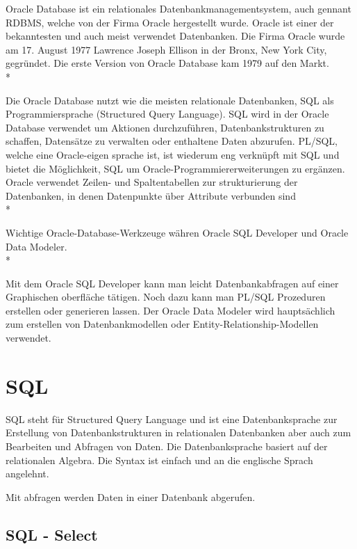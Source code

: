 Oracle Database ist ein relationales Datenbankmanagementsystem, auch gennant RDBMS, welche von der Firma Oracle hergestellt wurde. 
Oracle ist einer der bekanntesten und auch meist verwendet Datenbanken. Die Firma Oracle wurde am 17. August 1977 Lawrence  Joseph Ellison in der Bronx, New York City, gegründet.
Die erste Version von Oracle Database kam 1979 auf den Markt. \cite{OracleDB} \\*

Die Oracle Database nutzt wie die meisten relationale Datenbanken, SQL als Programmiersprache (Structured Query Language).
SQL wird in der Oracle Database verwendet um Aktionen durchzuführen, Datenbankstrukturen zu schaffen, Datensätze zu verwalten oder enthaltene Daten abzurufen. 
PL/SQL, welche eine Oracle-eigen sprache ist, ist wiederum eng verknüpft mit SQL und bietet die Möglichkeit, SQL um Oracle-Programmiererweiterungen zu ergänzen. 
Oracle verwendet Zeilen- und Spaltentabellen zur strukturierung der Datenbanken, in denen Datenpunkte über Attribute verbunden sind \cite{OracleDB} \\*

Wichtige Oracle-Database-Werkzeuge währen Oracle SQL Developer und Oracle Data Modeler. \\*

Mit dem Oracle SQL Developer kann man leicht Datenbankabfragen auf einer Graphischen oberfläche tätigen. Noch dazu kann man PL/SQL Prozeduren erstellen oder generieren lassen.
Der Oracle Data Modeler wird hauptsächlich zum erstellen von Datenbankmodellen oder Entity-Relationship-Modellen verwendet.



\section{SQL}
\author{David Ignjatovic}

SQL steht für Structured Query Language und ist eine Datenbanksprache zur Erstellung von Datenbankstrukturen in relationalen Datenbanken 
aber auch zum Bearbeiten und Abfragen von Daten. Die Datenbanksprache basiert auf der relationalen Algebra. Die Syntax ist einfach und an die englische Sprach angelehnt. 

Mit abfragen werden Daten in einer Datenbank abgerufen. \cite{SQL}

\subsection{SQL - Select}

